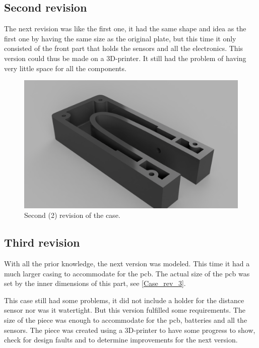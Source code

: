 \subsection{Second revision}
The next revision was like the first one, it had the same shape and idea as the first one by having the same size as the original plate, but this time it only consisted of the front part that holds the sensors and all the electronics. This version could thus be made on a 3D-printer. It still had the problem of having very little space for all the components.

\begin{figure}[H]
\begin{center}
	\includegraphics[width = .8\textwidth]{Figures/Case_rev_2.png}
	\caption{Second (2) revision of the case.}
	\label{Case_rev_2}
\end{center}
\end{figure}

\subsection{Third revision}
With all the prior knowledge, the next version was modeled. This time it had a much larger casing to accommodate for the \gls{pcb}. The actual size of the \gls{pcb} was set by the inner dimensions of this part, see \autoref{Case_rev_3}.

This case still had some problems, it did not include a holder for the distance sensor nor was it watertight. But this version fulfilled some requirements. The size of the piece was enough to accommodate for the \gls{pcb}, batteries and all the sensors. The piece was created using a 3D-printer to have some progress to show, check for design faults and to determine improvements for the next version.


